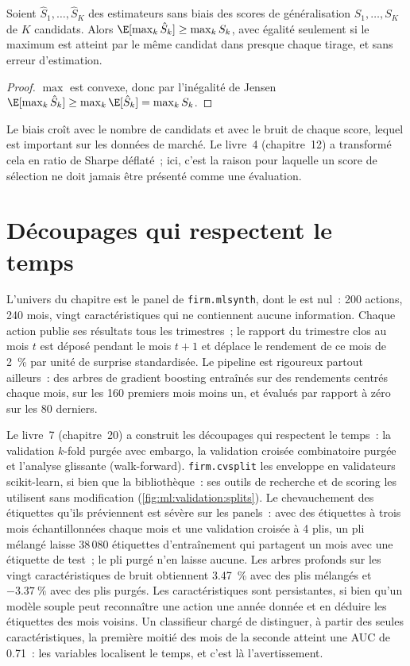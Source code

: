 \begin{proposition}\label{prop:ml:validation:max}
Soient $\hat S_1,\dots,\hat S_K$ des estimateurs sans biais des scores de généralisation $S_1,\dots,S_K$ de $K$ candidats. Alors
$\E[\max_k\hat S_k] \ge \max_kS_k$, avec égalité seulement si le maximum est atteint par le même candidat dans presque chaque
tirage, et sans erreur d'estimation.
\end{proposition}

\begin{proof}
$\max$ est convexe, donc par l'inégalité de Jensen $\E[\max_k\hat S_k] \ge \max_k\E[\hat S_k] = \max_kS_k$.
\end{proof}

Le biais croît avec le nombre de candidats et avec le bruit de chaque score, lequel est important sur les données de marché. Le livre~4
(chapitre~12) a transformé cela en ratio de Sharpe déflaté~; ici, c'est la raison pour laquelle un score de sélection ne doit jamais être présenté
comme une évaluation.

\section{Découpages qui respectent le temps}

L'univers du chapitre est le panel de \texttt{firm.mlsynth}, dont le  est nul~: 200 actions, 240 mois, vingt
caractéristiques qui ne contiennent aucune information. Chaque action publie ses résultats tous les trimestres~; le rapport du trimestre clos au mois $t$ est déposé
pendant le mois $t+1$ et déplace le rendement de ce mois de 2~\% par unité de surprise standardisée. Le pipeline est rigoureux
partout ailleurs~: des arbres de gradient boosting entraînés sur des rendements centrés chaque mois, sur les 160 premiers mois moins un, et évalués
par rapport à zéro sur les 80 derniers.

Le livre~7 (chapitre~20) a construit les découpages qui respectent le temps~: la validation $k$-fold purgée avec embargo, la validation croisée combinatoire
purgée et l'analyse glissante (walk-forward). \texttt{firm.cvsplit} les enveloppe en validateurs scikit-learn, si bien que la
bibliothèque~: ses outils de recherche et de scoring les utilisent sans modification (\cref{fig:ml:validation:splits}). Le chevauchement des étiquettes
qu'ils préviennent est sévère sur les panels~: avec des étiquettes à trois mois échantillonnées chaque mois et une validation croisée à 4 plis, un pli mélangé laisse
38\,080 étiquettes d'entraînement qui partagent un mois avec une étiquette de test~; le pli purgé n'en laisse aucune. Les arbres profonds sur les vingt
caractéristiques de bruit obtiennent 3.47~\% avec des plis mélangés et $-3.37~\%$ avec des plis purgés. Les caractéristiques sont
persistantes, si bien qu'un modèle souple peut reconnaître une action une année donnée et en déduire les étiquettes des mois voisins.
Un classifieur chargé de distinguer, à partir des seules caractéristiques, la première moitié des mois de la seconde atteint une AUC
de 0.71~: les variables localisent le temps, et c'est là l'avertissement.

